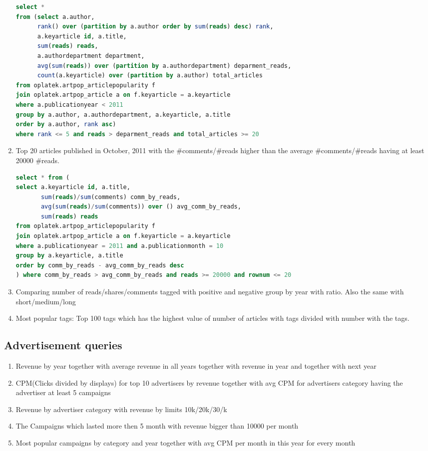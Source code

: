 \begin{enumerate}
\begin{lstlisting}[language=sql] 
select *
from (select a.author, 
      rank() over (partition by a.author order by sum(reads) desc) rank,
      a.keyarticle id, a.title,
      sum(reads) reads, 
      a.authordepartment department,
      avg(sum(reads)) over (partition by a.authordepartment) deparment_reads,
      count(a.keyarticle) over (partition by a.author) total_articles
from oplatek.artpop_articlepopularity f
join oplatek.artpop_article a on f.keyarticle = a.keyarticle
where a.publicationyear < 2011
group by a.author, a.authordepartment, a.keyarticle, a.title
order by a.author, rank asc)
where rank <= 5 and reads > deparment_reads and total_articles >= 20
\end{lstlisting}
\item    Top 20 articles published in October, 2011 with the \#comments/\#reads higher than the average \#comments/\#reads having at least 20000 \#reads.
\begin{lstlisting}[language=sql] 
select * from (
select a.keyarticle id, a.title,
       sum(reads)/sum(comments) comm_by_reads,
       avg(sum(reads)/sum(comments)) over () avg_comm_by_reads,
       sum(reads) reads
from oplatek.artpop_articlepopularity f
join oplatek.artpop_article a on f.keyarticle = a.keyarticle
where a.publicationyear = 2011 and a.publicationmonth = 10
group by a.keyarticle, a.title
order by comm_by_reads - avg_comm_by_reads desc
) where comm_by_reads > avg_comm_by_reads and reads >= 20000 and rownum <= 20
\end{lstlisting}
\item    Comparing number of reads/shares/comments tagged with positive and negative group by year with ratio. Also the same with short/medium/long
\item    Most popular tags:  Top 100 tags which has the highest value of number of articles with tags divided with number with the tags.
\end{enumerate}

\subsection*{Advertisement  queries} %
\label{sub:Advertisement queries}

\begin{enumerate}
\item    Revenue by year together with average revenue in all years together with revenue in year and together with next year
\item    CPM(Clicks divided by displays) for top 10 advertisers by revenue together with avg CPM for advertisers category having the advertiser at least 5 campaigns
\item    Revenue by advertiser category with revenue by limits 10k/20k/30/k
\item    The Campaigns which lasted more then 5 month with revenue bigger than 10000 per month
\item    Most popular campaigns by category and year together with avg CPM per month in this year for every month
\end{enumerate}

